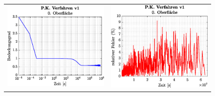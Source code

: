 \documentclass{listhesis}
\begin{document}
\begin{figure}[!h]
\begin{tabular}{@{}cc@{}}
\includegraphics[width=\wss\textwidth]{./include/figure_3.5/PC_current/CovFacet0.eps}&
\includegraphics[width=\wss\textwidth]{./include/figure_3.5/PC_current/CovFacetError0.eps}\\

\end{tabular}
\end{figure}
\end{document}
